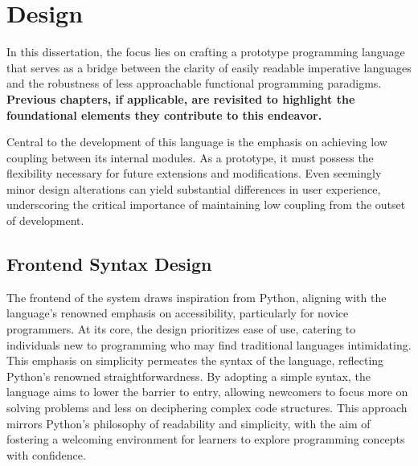 \documentclass{l4proj}
\begin{document}

\chapter{Design}


In this dissertation, the focus lies on crafting a prototype programming language that serves as a bridge between the clarity of easily readable imperative languages and the robustness of less approachable functional programming paradigms.
\textbf{Previous chapters, if applicable, are revisited to highlight the foundational elements they contribute to this endeavor.}

Central to the development of this language is the emphasis on achieving low coupling between its internal modules.
As a prototype, it must possess the flexibility necessary for future extensions and modifications.
Even seemingly minor design alterations can yield substantial differences in user experience, underscoring the critical importance of maintaining low coupling from the outset of development.

\section{Frontend Syntax Design}

The frontend of the system draws inspiration from Python, aligning with the language's renowned emphasis on accessibility, particularly for novice programmers.
At its core, the design prioritizes ease of use, catering to individuals new to programming who may find traditional languages intimidating.
This emphasis on simplicity permeates the syntax of the language, reflecting Python's renowned straightforwardness.
By adopting a simple syntax, the language aims to lower the barrier to entry, allowing newcomers to focus more on solving problems and less on deciphering complex code structures.
This approach mirrors Python's philosophy of readability and simplicity, with the aim of fostering a welcoming environment for learners to explore programming concepts with confidence.
\end{document}
